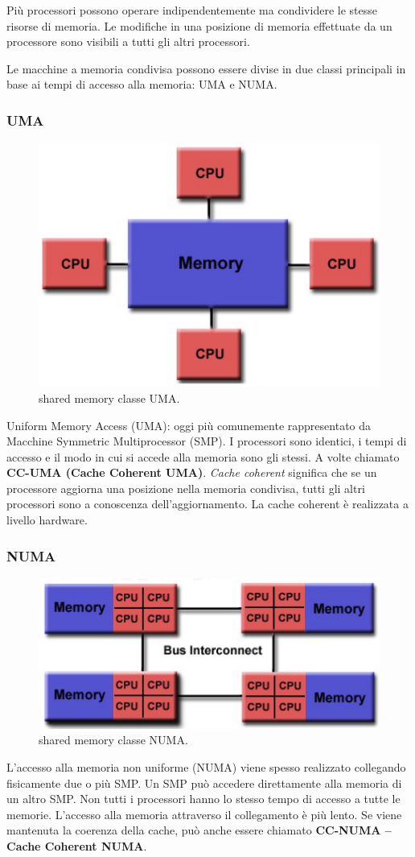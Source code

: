 Più processori possono operare indipendentemente ma condividere le stesse
risorse di memoria. Le modifiche in una posizione di memoria effettuate da un processore sono visibili a tutti
gli altri processori. 

Le macchine a memoria condivisa possono essere divise in due classi principali in base ai tempi di accesso alla memoria: UMA e NUMA.
\subsubsection{UMA}
\begin{figure}[th]
	\centering
	\includegraphics[width=0.7\linewidth]{img/shared-memory}
	\caption{shared memory classe UMA.}
	\label{fig:shared-memory}
\end{figure}
Uniform Memory Access (UMA): oggi più comunemente rappresentato da Macchine Symmetric
Multiprocessor (SMP). I processori sono identici, i tempi di accesso e il modo in cui si accede alla memoria sono gli stessi. A volte chiamato \textbf{CC-UMA (Cache Coherent UMA)}. \textit{Cache coherent} significa che se un processore aggiorna una posizione nella memoria condivisa, tutti gli altri processori sono a conoscenza dell'aggiornamento. La cache coherent è realizzata a livello hardware.
\subsubsection{NUMA}
\begin{figure}[th]
	\centering
	\includegraphics[width=0.7\linewidth]{img/numa}
	\caption{shared memory classe NUMA.}
	\label{fig:numa}
\end{figure}
L'accesso alla memoria non uniforme (NUMA) viene spesso realizzato collegando fisicamente due o più SMP. Un SMP può accedere direttamente alla memoria di un altro SMP. Non tutti i processori hanno lo stesso tempo di accesso a tutte le memorie. L'accesso alla memoria attraverso il collegamento è più lento. Se viene mantenuta la coerenza della cache, può anche essere chiamato \textbf{CC-NUMA --
Cache Coherent NUMA}.
